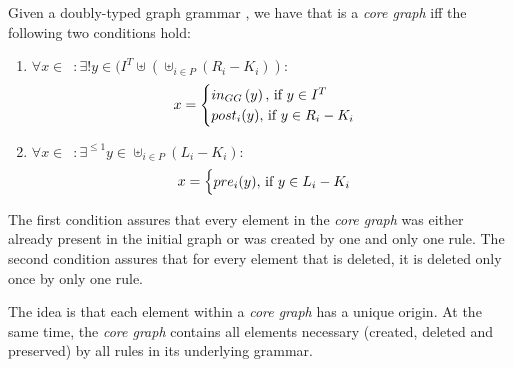 \begin{definition}\label{def:core-graph} Given a doubly-typed graph grammar \doublyTypedGraphGrammarCore{}, we have that \coreGraph{} is a \emph{core graph} iff the following two conditions hold:

\begin{enumerate}

\item \mbox{$\forall x \in$ \coreGraph $: \exists! y \in (I^T \uplus (\uplus_{i \in P} (R_i - K_i))$}:
\[ x =
    \begin{cases}
      in_{GG}\parens{y},$ if $y \in I^T\\
      post_i(y),$ if $y \in R_i - K_i\\
    \end{cases}
   \]

\item \mbox{$\forall x \in$ \coreGraph $: \exists^{\leq1} y \in \uplus_{i \in P} (L_i - K_i)$}:
\[ x =
    \begin{cases}
      pre_i(y),$ if $y \in L_i - K_i\\
    \end{cases}
   \]\end{enumerate}

  The first condition assures that every element in the \emph{core graph} was either already present in the initial graph or was created by one and only one rule. The second condition assures that for every element that is deleted, it is deleted only once by only one rule.
\end{definition}

The idea is that each element within a \emph{core graph} has a unique origin. At the same time, the \emph{core graph} contains all elements necessary (created, deleted and preserved) by all rules in its underlying grammar.  

